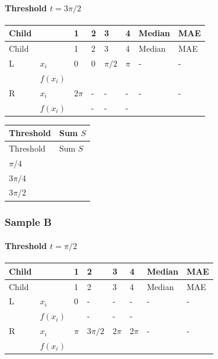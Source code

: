 \documentclass[10pt]{article}
\begin{document}
\paragraph*{Threshold $t=3\pi/2$}
\begingroup
\small
\setlength{\tabcolsep}{4pt}
\begin{longtable}{l|l|l|l|l|l|l|l}
Child &  & 1 & 2 & 3 & 4 & Median & MAE \\
\hline
\endfirsthead
Child &  & 1 & 2 & 3 & 4 & Median & MAE \\
\hline
\endhead
L & $x_i$ & $0$ & $0$ & $\pi/2$ & $\pi$ & - & - \\[3pt]
 & $f(x_i)$ & $\phantom{0}$ & $\phantom{0}$ & $\phantom{0}$ & $\phantom{0}$ & $\phantom{0}$ & $\phantom{0}$ \\[3pt]
R & $x_i$ & $2\pi$ & - & - & - & - & - \\[3pt]
 & $f(x_i)$ & $\phantom{0}$ & - & - & - & $\phantom{0}$ & $\phantom{0}$ \\[3pt]
\end{longtable}
\endgroup
\begingroup
\small
\setlength{\tabcolsep}{4pt}
\begin{longtable}{l|l}
Threshold & Sum $S$ \\
\hline
\endfirsthead
Threshold & Sum $S$ \\
\hline
\endhead
$\pi/4$ & $\phantom{0}$ \\[3pt]
$3\pi/4$ & $\phantom{0}$ \\[3pt]
$3\pi/2$ & $\phantom{0}$ \\[3pt]
\end{longtable}
\endgroup
\subsubsection*{Sample B}
\paragraph*{Threshold $t=\pi/2$}
\begingroup
\small
\setlength{\tabcolsep}{4pt}
\begin{longtable}{l|l|l|l|l|l|l|l}
Child &  & 1 & 2 & 3 & 4 & Median & MAE \\
\hline
\endfirsthead
Child &  & 1 & 2 & 3 & 4 & Median & MAE \\
\hline
\endhead
L & $x_i$ & $0$ & - & - & - & - & - \\[3pt]
 & $f(x_i)$ & $\phantom{0}$ & - & - & - & $\phantom{0}$ & $\phantom{0}$ \\[3pt]
R & $x_i$ & $\pi$ & $3\pi/2$ & $2\pi$ & $2\pi$ & - & - \\[3pt]
 & $f(x_i)$ & $\phantom{0}$ & $\phantom{0}$ & $\phantom{0}$ & $\phantom{0}$ & $\phantom{0}$ & $\phantom{0}$ \\[3pt]
\end{longtable}
\endgroup
\end{document}

